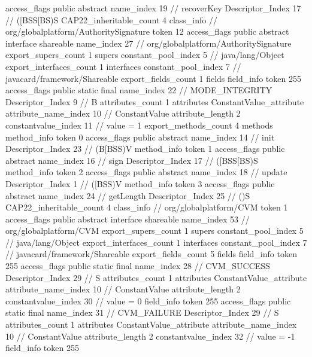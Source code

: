 {{{{{					access_flags	public abstract
					name_index	19		// recoverKey
					Descriptor_Index	17		// ([BSS[BS)S
				}
			}
			CAP22_inheritable_count	4
		}
		class_info {		// org/globalplatform/AuthoritySignature
			token	12
			access_flags	public abstract interface shareable
			name_index	27		// org/globalplatform/AuthoritySignature
			export_supers_count	1
			supers {
				constant_pool_index	5		// java/lang/Object
			}
			export_interfaces_count	1
			interfaces {
				constant_pool_index	7		// javacard/framework/Shareable
			}
			export_fields_count	1
			fields {
			field_info {
				token	255
				access_flags	public static final
				name_index	22		// MODE_INTEGRITY
				Descriptor_Index	9		// B
				attributes_count	1
				attributes {
				ConstantValue_attribute {
					attribute_name_index	10		// ConstantValue
					attribute_length	2
					constantvalue_index	11		// value = 1
				}
				}
			}
			}
			export_methods_count	4
			methods {
				method_info {
					token	0
					access_flags	public abstract
					name_index	14		// init
					Descriptor_Index	23		// (B[BSS)V
				}
				method_info {
					token	1
					access_flags	public abstract
					name_index	16		// sign
					Descriptor_Index	17		// ([BSS[BS)S
				}
				method_info {
					token	2
					access_flags	public abstract
					name_index	18		// update
					Descriptor_Index	1		// ([BSS)V
				}
				method_info {
					token	3
					access_flags	public abstract
					name_index	24		// getLength
					Descriptor_Index	25		// ()S
				}
			}
			CAP22_inheritable_count	4
		}
		class_info {		// org/globalplatform/CVM
			token	1
			access_flags	public abstract interface shareable
			name_index	53		// org/globalplatform/CVM
			export_supers_count	1
			supers {
				constant_pool_index	5		// java/lang/Object
			}
			export_interfaces_count	1
			interfaces {
				constant_pool_index	7		// javacard/framework/Shareable
			}
			export_fields_count	5
			fields {
			field_info {
				token	255
				access_flags	public static final
				name_index	28		// CVM_SUCCESS
				Descriptor_Index	29		// S
				attributes_count	1
				attributes {
				ConstantValue_attribute {
					attribute_name_index	10		// ConstantValue
					attribute_length	2
					constantvalue_index	30		// value = 0
				}
				}
			}
			field_info {
				token	255
				access_flags	public static final
				name_index	31		// CVM_FAILURE
				Descriptor_Index	29		// S
				attributes_count	1
				attributes {
				ConstantValue_attribute {
					attribute_name_index	10		// ConstantValue
					attribute_length	2
					constantvalue_index	32		// value = -1
				}
				}
			}
			field_info {
				token	255
}}}}}
